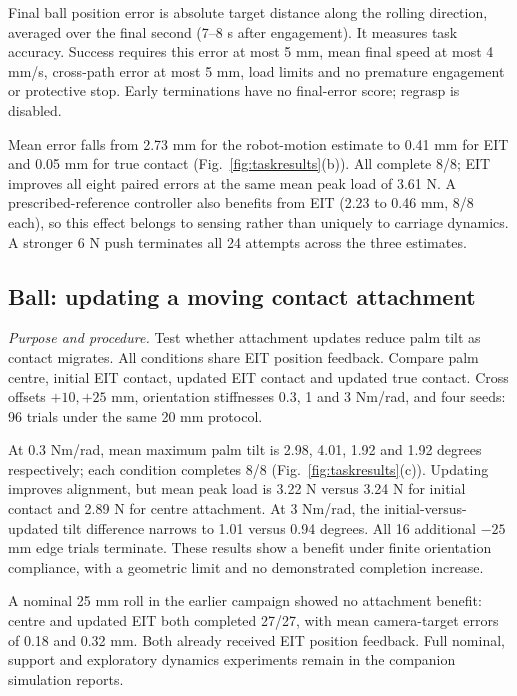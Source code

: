 \documentclass[letterpaper,10pt,conference]{IEEEtran}
\begin{document}
Final ball position error is absolute target distance along the rolling direction, averaged over the final second (7--8 s after engagement). It measures task accuracy. Success requires this error at most 5 mm, mean final speed at most 4 mm/s, cross-path error at most 5 mm, load limits and no premature engagement or protective stop. Early terminations have no final-error score; regrasp is disabled.

Mean error falls from 2.73 mm for the robot-motion estimate to 0.41 mm for EIT and 0.05 mm for true contact (Fig.~\ref{fig:taskresults}(b)). All complete 8/8; EIT improves all eight paired errors at the same mean peak load of 3.61 N. A prescribed-reference controller also benefits from EIT (2.23 to 0.46 mm, 8/8 each), so this effect belongs to sensing rather than uniquely to carriage dynamics. A stronger 6 N push terminates all 24 attempts across the three estimates.

\subsection{Ball: updating a moving contact attachment}
\textit{Purpose and procedure.} Test whether attachment updates reduce palm tilt as contact migrates. All conditions share EIT position feedback. Compare palm centre, initial EIT contact, updated EIT contact and updated true contact. Cross offsets $+10,+25$ mm, orientation stiffnesses 0.3, 1 and 3 Nm/rad, and four seeds: 96 trials under the same 20 mm protocol.

At 0.3 Nm/rad, mean maximum palm tilt is 2.98, 4.01, 1.92 and 1.92 degrees respectively; each condition completes 8/8 (Fig.~\ref{fig:taskresults}(c)). Updating improves alignment, but mean peak load is 3.22 N versus 3.24 N for initial contact and 2.89 N for centre attachment. At 3 Nm/rad, the initial-versus-updated tilt difference narrows to 1.01 versus 0.94 degrees. All 16 additional $-25$ mm edge trials terminate. These results show a benefit under finite orientation compliance, with a geometric limit and no demonstrated completion increase.

A nominal 25 mm roll in the earlier campaign showed no attachment benefit: centre and updated EIT both completed 27/27, with mean camera-target errors of 0.18 and 0.32 mm. Both already received EIT position feedback. Full nominal, support and exploratory dynamics experiments remain in the companion simulation reports.
\end{document}
